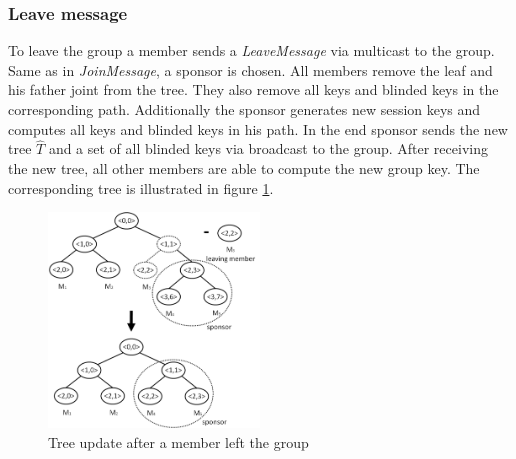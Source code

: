 \subsubsection{Leave message}
To leave the group a member sends a \textit{LeaveMessage} via multicast to the group. Same as in \textit{JoinMessage}, a sponsor is chosen. All members remove the leaf and his father joint from the tree. They also remove all keys and blinded keys in the corresponding path. Additionally the sponsor generates new session keys and computes all keys and blinded keys in his path. In the end sponsor sends the new tree $\widehat{T}$ and a set of all blinded keys via broadcast to the group. After receiving the new tree, all other members are able to compute the new group key. The corresponding tree is illustrated in figure \ref{fig:tgdh_leave}.
\begin{figure}[!h]
\centering\includegraphics[width=0.5\textwidth]{Images/tgdh_leave}
\caption{Tree update after a member left the group}
\label{fig:tgdh_leave}
\end{figure}\noindent
